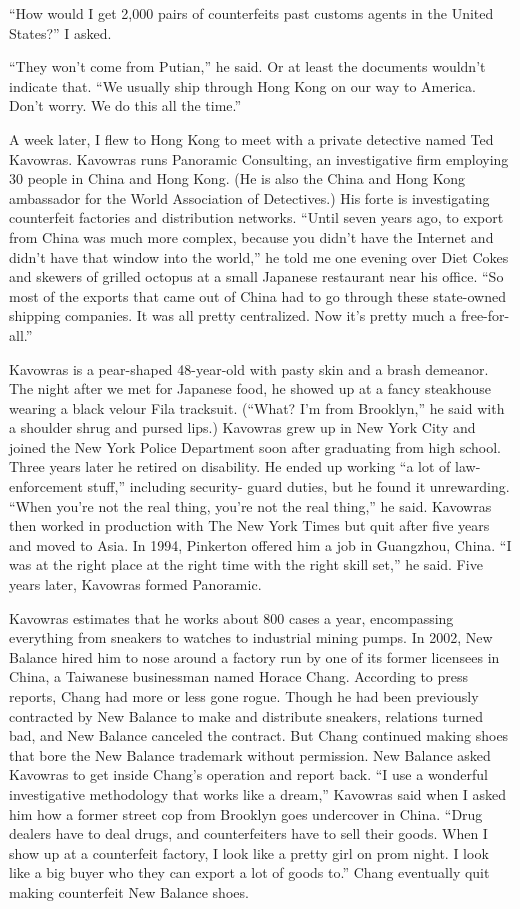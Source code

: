 ﻿\documentclass[12pt]{article}
\begin{document}
``How would I get 2,000 pairs of counterfeits past customs agents in the United States?'' I asked.

``They won't come from Putian,'' he said. Or at least the documents wouldn't indicate that. ``We
usually ship through Hong Kong on our way to America. Don't worry. We do this all the time.''

A week later, I flew to Hong Kong to meet with a private detective named Ted Kavowras. Kavowras runs
Panoramic Consulting, an investigative firm employing 30 people in China and Hong Kong. (He is also
the China and Hong Kong ambassador for the World Association of Detectives.) His forte is
investigating counterfeit factories and distribution networks. ``Until seven years ago, to export
from China was much more complex, because you didn't have the Internet and didn't have that window
into the world,'' he told me one evening over Diet Cokes and skewers of grilled octopus at a small
Japanese restaurant near his office. ``So most of the exports that came out of China had to go
through these state-owned shipping companies. It was all pretty centralized. Now it's pretty much a
free-for-all.''

Kavowras is a pear-shaped 48-year-old with pasty skin and a brash demeanor. The night after we met
for Japanese food, he showed up at a fancy steakhouse wearing a black velour Fila tracksuit.
(``What? I'm from Brooklyn,'' he said with a shoulder shrug and pursed lips.) Kavowras grew up in
New York City and joined the New York Police Department soon after graduating from high school.
Three years later he retired on disability. He ended up working ``a lot of law-enforcement stuff,''
including security- guard duties, but he found it unrewarding. ``When you're not the real thing,
you're not the real thing,'' he said. Kavowras then worked in production with The New York Times but
quit after five years and moved to Asia. In 1994, Pinkerton offered him a job in Guangzhou, China.
``I was at the right place at the right time with the right skill set,'' he said. Five years later,
Kavowras formed Panoramic.

Kavowras estimates that he works about 800 cases a year, encompassing everything from sneakers to
watches to industrial mining pumps. In 2002, New Balance hired him to nose around a factory run by
one of its former licensees in China, a Taiwanese businessman named Horace Chang. According to press
reports, Chang had more or less gone rogue. Though he had been previously contracted by New Balance
to make and distribute sneakers, relations turned bad, and New Balance canceled the contract. But
Chang continued making shoes that bore the New Balance trademark without permission. New Balance
asked Kavowras to get inside Chang's operation and report back. ``I use a wonderful investigative
methodology that works like a dream,'' Kavowras said when I asked him how a former street cop from
Brooklyn goes undercover in China. ``Drug dealers have to deal drugs, and counterfeiters have to
sell their goods. When I show up at a counterfeit factory, I look like a pretty girl on prom night.
I look like a big buyer who they can export a lot of goods to.'' Chang eventually quit making
counterfeit New Balance shoes.
\end{document}
